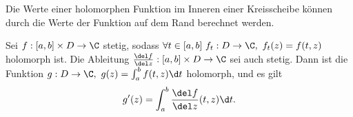		\begin{rem}
			Die Werte einer holomorphen Funktion im Inneren einer Kreisscheibe können durch die Werte der Funktion auf dem Rand berechnet werden.
		\end{rem}
		
		\begin{rem}
			Sei $ f: [a,b]\times D \to \C $ stetig, sodass $ \forall t \in [a,b]\ f_t: D \to \C,\ f_t(z) = f(t,z) $ holomorph ist. Die Ableitung $ \frac{\del f}{\del z}: [a,b]\times D \to \C $ sei auch stetig. Dann ist die Funktion $ g: D \to \C,\ g(z) = \int_a^b f(t,z) \d t $ holomorph, und es gilt
			\[ g'(z) = \int_a^b \frac{\del f}{\del z}(t,z)\d t. \]
		\end{rem}